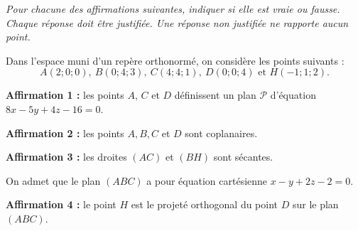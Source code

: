 \textit{Pour chacune des affirmations suivantes, indiquer si elle est vraie ou fausse. Chaque réponse doit être justifiée. Une réponse non justifiée ne rapporte aucun point.}

\bigskip

Dans l'espace muni d'un repère orthonormé, on considère les points suivants : \[ A(2;0;0),~ B(0;4;3),~C(4;4;1),~D(0;0;4) \text{ et } H(-1;1;2). \]

\smallskip


\textbf{Affirmation 1 :} les points $A$, $C$ et $D$ définissent un plan $\mathcal{P}$ d'équation $8x-5y+4z-16=0$.

\smallskip

\textbf{Affirmation 2 :} les points $A, B, C$ et $D$ sont coplanaires.

\smallskip

\textbf{Affirmation 3 :} les droites $(AC)$ et $(BH)$ sont sécantes.

\smallskip

On admet que le plan $(ABC)$ a pour équation cartésienne $x-y+2 z-2=0$.

\smallskip

\textbf{Affirmation 4 :} le point $H$ est le projeté orthogonal du point $D$ sur le plan $(ABC)$.